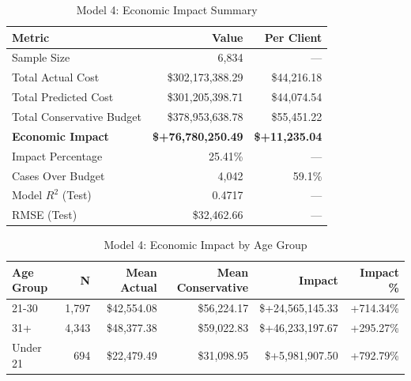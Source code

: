 \begin{table}[htbp]
\centering
\small
\caption{Model 4: Economic Impact Summary}
\label{tab:model4_impact_summary}
\begin{tabular}{lrr}
\toprule
\textbf{Metric} & \textbf{Value} & \textbf{Per Client} \\
\midrule
Sample Size & 6,834 & --- \\
\midrule
Total Actual Cost & \$302,173,388.29 & \$44,216.18 \\
Total Predicted Cost & \$301,205,398.71 & \$44,074.54 \\
Total Conservative Budget & \$378,953,638.78 & \$55,451.22 \\
\midrule
\textbf{Economic Impact} & \textbf{\$+76,780,250.49} & \textbf{\$+11,235.04} \\
Impact Percentage & 25.41\% & --- \\
\midrule
Cases Over Budget & 4,042 & 59.1\% \\
\midrule
Model $R^2$ (Test) & 0.4717 & --- \\
RMSE (Test) & \$32,462.66 & --- \\
\bottomrule
\end{tabular}
\end{table}

\begin{table}[htbp]
\centering
\small
\caption{Model 4: Economic Impact by Age Group}
\label{tab:model4_impact_age}
\begin{tabular}{lrrrrr}
\toprule
\textbf{Age Group} & \textbf{N} & \textbf{Mean Actual} & \textbf{Mean Conservative} & \textbf{Impact} & \textbf{Impact \%} \\
\midrule
21-30 & 1,797 & \$42,554.08 & \$56,224.17 & \$+24,565,145.33 & +714.34\% \\
31+ & 4,343 & \$48,377.38 & \$59,022.83 & \$+46,233,197.67 & +295.27\% \\
Under 21 & 694 & \$22,479.49 & \$31,098.95 & \$+5,981,907.50 & +792.79\% \\
\bottomrule
\end{tabular}
\end{table}

